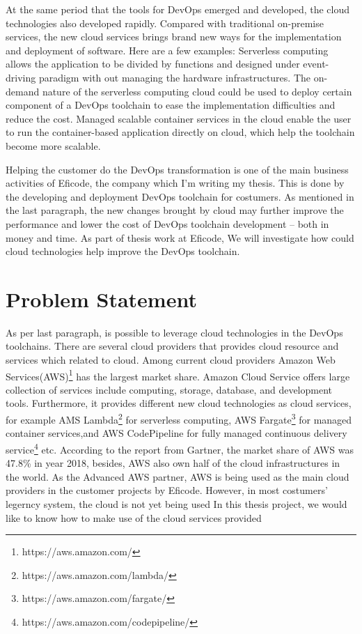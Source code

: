 \par
At the same period that the tools for DevOps emerged and developed, the cloud technologies also developed rapidly. Compared with traditional on-premise services, the new cloud services brings brand new ways for the implementation and deployment of software. Here are a few examples: Serverless computing allows the application to be divided by functions and designed under event-driving paradigm with out managing the hardware infrastructures. The on-demand nature of the serverless computing cloud could be used to deploy certain component of a DevOps toolchain to ease the implementation difficulties and reduce the cost. Managed scalable container services in the cloud enable the user to run the container-based application directly on cloud, which help the toolchain become more scalable. 
\par
\par
Helping the customer do the DevOps transformation is one of the main business activities of Eficode, the company which I'm writing my thesis. This is done by the developing and deployment DevOps toolchain for costumers. As mentioned in the last paragraph, the new changes brought by cloud may further improve the performance and lower the cost of DevOps toolchain development -- both in money and time. As part of thesis work at Eficode, We will investigate how could cloud technologies help improve the DevOps toolchain. 
\section{Problem Statement}
\par
As per last paragraph, is possible to leverage cloud technologies in the  DevOps toolchains. There are several cloud providers that provides cloud resource and services which related to cloud. Among current cloud providers Amazon Web Services(AWS)\footnote{https://aws.amazon.com/} has the largest market share. Amazon Cloud Service offers large collection of services include computing, storage, database, and development tools. Furthermore, it provides different new cloud technologies as cloud services, for example AMS Lambda\footnote{https://aws.amazon.com/lambda/} for serverless computing, AWS Fargate\footnote{https://aws.amazon.com/fargate/} for managed container services,and AWS CodePipeline for fully managed continuous delivery service\footnote{https://aws.amazon.com/codepipeline/} etc. According to the report from Gartner, the market share of AWS was 47.8\% in year 2018, besides, AWS also own half of the cloud infrastructures in the world\cite{GartnerS47:online}. As the Advanced AWS partner, AWS is being used as the main cloud providers in the customer projects by Eficode. 
However, in most costumers' legerncy system, the cloud is not yet being used 
In this thesis project, we would like to know how to make use of the cloud services provided 
\par

